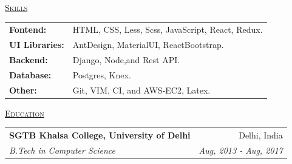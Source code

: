 \documentclass[11pt, a4paper]{article}
\begin{document}
\begin{flushleft}
    \uline{\textsc{\large{Skills}}\hfill}
    \newline
    \newline
    \begin{tabular}{l l}
        \textbf{Fontend: } & HTML, CSS, Less, Scss, JavaScript, React, Redux.\\
        \textbf{UI Libraries: } & AntDesign, MaterialUI, ReactBootstrap.\\
        \textbf{Backend: } & Django, Node,and Rest API.\\
        \textbf{Database: } & Postgres, Knex.\\
        \textbf{Other: } & Git, VIM, CI, and AWS-EC2, Latex.\\
    \end{tabular}
    \newline
\end{flushleft}

\begin{flushleft}
    \uline{\textsc{\large{Education}}\hfill}
    \newline
    \newline
    \setlength\tabcolsep{0pt}
    \begin{tabularx}{\textwidth}{X r}
        \large{\textbf{SGTB Khalsa College, University of Delhi}} & Delhi, India \\
        \textit{B.Tech in Computer Science} & \textit{Aug, 2013 - Aug, 2017} \\
    \end{tabularx}
    \newline
\end{flushleft}
\end{document}
